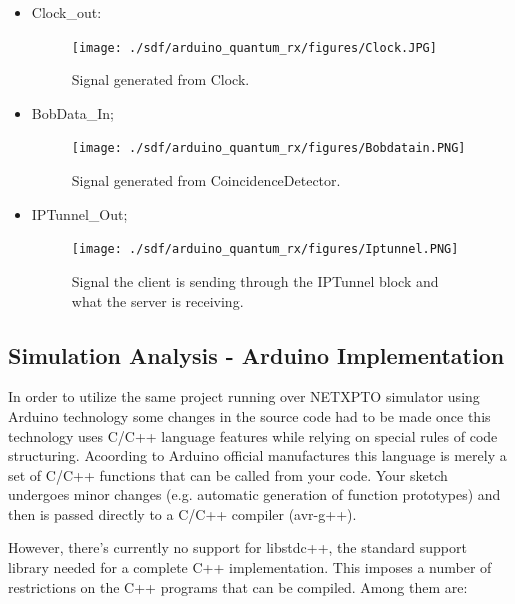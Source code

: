 \begin{refsection}
\begin{itemize}
	
	\item Clock\_out:
	\begin{figure}[H]
		\centering
		\texttt{[image: ./sdf/arduino\_quantum\_rx/figures/Clock.JPG]}
		\caption{Signal generated from Clock.}
		\label{fig:arduino}
	\end{figure}
	\clearpage
	
	\item BobData\_In;
	\begin{figure}[H]
		\centering
		\texttt{[image: ./sdf/arduino\_quantum\_rx/figures/Bobdatain.PNG]}
		\caption{Signal generated from CoincidenceDetector.}
		\label{fig:arduino}
	\end{figure}

		\item IPTunnel\_Out;
	\begin{figure}[H]
		\centering
		\texttt{[image: ./sdf/arduino\_quantum\_rx/figures/Iptunnel.PNG]}
		\caption{Signal the client is sending through the IPTunnel block and what the server is receiving.}
		\label{fig:arduino}
		
	\end{figure}

\end{itemize}


	\subsection{Simulation Analysis - Arduino Implementation}
	
	In order to utilize the same project running over NETXPTO simulator using Arduino technology some changes in the source code had to be made once this technology uses C/C++ language features while relying on special rules of code structuring. Acoording to Arduino official manufactures this language is merely a set of C/C++ functions that can be called from your code. Your sketch undergoes minor changes (e.g. automatic generation of function prototypes) and then is passed directly to a C/C++ compiler (avr-g++). \par However, there's currently no support for libstdc++, the standard support library needed for a complete C++ implementation. This imposes a number of restrictions on the C++ programs that can be compiled. Among them are:
	

\end{refsection}

